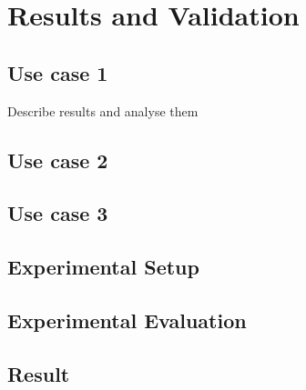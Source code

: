 
\chapter{Results and Validation}

\section{Use case 1}
Describe results and analyse them

\section{Use case 2}

\section{Use case 3}

\section{Experimental Setup}
\section{Experimental Evaluation}

\section{Result}


